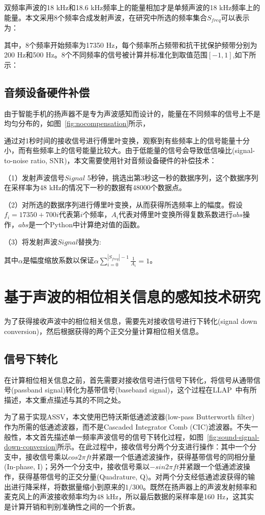 双频率声波的18 kHz和18.6 kHz频率上的能量相加才是单频声波的18 kHz频率上的能量。本文采用8个频率合成发射声波，在研究中所选的频率集合$S_{freq}$可以表示为：

其中，8个频率开始频率为17350 Hz，每个频率所占频带和抗干扰保护频带分别为200 Hz和500 Hz。8个不同频率的信号被计算并标准化到取值范围$[-1,1]$,如下所示：


\subsection{音频设备硬件补偿}
由于智能手机的扬声器不是专为声波感知而设计的，能量在不同频率的信号上不是均匀分布的，如图~\ref{fig:nocompensation}所示，

通过对1秒时间的接收信号进行傅里叶变换，观察到有些频率上的信号能量十分小，而有些频率上的信号能量比较大。由于低能量的信号会导致低信噪比(signal-to-noise ratio, SNR)，本文需要使用针对音频设备硬件的补偿技术：

（1）发射声波信号$Signal$ 5秒钟，挑选出第3秒这一秒的数据序列，这个数据序列在采样率为48 kHz的情况下一秒的数据有48000个数据点。

（2）对所选的数据序列进行傅里叶变换，从而获得所选频率上的幅度。假设$f_{i} = 17350 + 700i$代表第$i$个频率，$A_{i}$代表对傅里叶变换所得复数系数进行$abs$操作，$abs$是一个Python中计算绝对值的函数。

（3）将发射声波$Signal$替换为:

其中$\alpha$是幅度缩放系数以保证$\alpha \sum_{i=0}^{|S_{freq}|-1}\frac{1}{A_i}=1$。

\section{基于声波的相位相关信息的感知技术研究}\label{sec:sensing-research}
为了获得接收声波中的相位相关信息，需要先对接收信号进行下转化(signal down conversion)，然后根据获得的两个正交分量计算相位相关信息。

\subsection{信号下转化}
在计算相位相关信息之前，首先需要对接收信号进行信号下转化，将信号从通带信号(passband signal)转化为基带信号(baseband signal)，这个过程在LLAP~\cite{wang2016device}中有所描述，本文重点描述与其的不同之处。

为了易于实现ASSV，本文使用巴特沃斯低通滤波器(low-pass Butterworth filter)作为所需的低通滤波器，而不是Cascaded Integrator Comb (CIC)滤波器。不失一般性，本文首先描述单一频率声波信号的信号下转化过程，如图~\ref{fig:sound-signal-down-conversion}所示。在此过程中，接收信号分两个分支进行操作：其中一个分支中，接收信号乘以$cos2\pi ft$并紧跟一个低通滤波操作，获得基带信号的同相分量(In-phase, I)；另外一个分支中，接收信号乘以$-sin2\pi ft$并紧跟一个低通滤波操作，获得基带信号的正交分量(Quadrature, Q)。对两个分支经低通滤波获得的输出进行降采样，将数据量缩小到原来的$1/300$。既然在扬声器上的声波发射频率和麦克风上的声波接收频率均为48 kHz，所以最后数据的采样率是160 Hz，这其实是计算开销和判别准确性之间的一个折衷。


